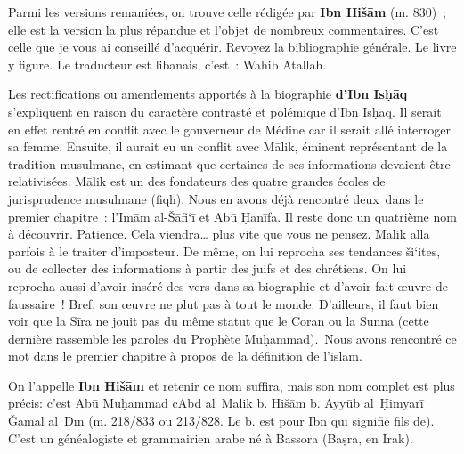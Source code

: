 Parmi les versions remaniées, on trouve celle rédigée par \textbf{Ibn
Hišām} (m. 830)~; elle est la version la plus répandue et l'objet de
nombreux commentaires. C'est celle que je vous ai conseillé d'acquérir.
Revoyez la bibliographie générale. Le livre y figure. Le traducteur est
libanais, c'est~: Wahib Atallah.

Les rectifications ou amendements apportés à la biographie \textbf{d'Ibn
Isḥāq} s'expliquent en raison du caractère contrasté et polémique d'Ibn
Isḥāq. Il serait en effet rentré en conflit avec le gouverneur de Médine
car il serait allé interroger sa femme. Ensuite, il aurait eu un conflit
avec Mālik, éminent représentant de la tradition musulmane, en estimant
que certaines de ses informations devaient être relativisées. Mālik est
un des fondateurs des quatre grandes écoles de jurisprudence musulmane
(fiqh). Nous en avons déjà rencontré deux~dans le premier chapitre~:
l'Imām al-Šāfi`ī et Abū Ḥanīfa. Il reste donc un quatrième nom à
découvrir. Patience. Cela viendra\ldots{} plus vite que vous ne pensez.
Mālik alla parfois à le traiter d'imposteur. De même, on lui reprocha
ses tendances ši`ites, ou de collecter des informations à partir des
juifs et des chrétiens. On lui reprocha aussi d'avoir inséré des vers
dans sa biographie et d'avoir fait œuvre de faussaire~! Bref, son œuvre
ne plut pas à tout le monde. D'ailleurs, il faut bien voir que la Sīra
ne jouit pas du même statut que le Coran ou la Sunna (cette dernière
rassemble les paroles du Prophète Muḥammad).~Nous avons rencontré ce mot
dans le premier chapitre à propos de la définition de l'islam.


On l'appelle \textbf{Ibn Hišām} et retenir ce nom suffira, mais son nom
complet est plus précis: c'est Abū Muḥammad cAbd al~Malik b. Hišām b.
Ayyūb al~Ḥimyarī Ǧamal al~Dīn (m. 218/833 ou 213/828. Le b. est pour Ibn
qui signifie fils de). C'est un généalogiste et grammairien arabe né à
Bassora (Baṣra, en Irak).


